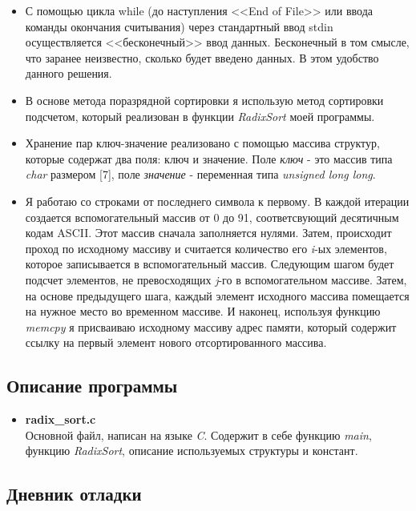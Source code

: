 \documentclass[12pt]{article}
\begin{document}
\begin{itemize}
    \item С помощью цикла while (до наступления <<End of File>> или ввода команды окончания считывания) через стандартный ввод stdin осуществляется <<бесконечный>> ввод данных. Бесконечный в том смысле, что заранее неизвестно, сколько будет введено данных. В этом удобство данного решения.
    \item В основе метода поразрядной сортировки я использую метод сортировки подсчетом, который реализован в функции {\it RadixSort} моей программы.
    \item Хранение пар ключ-значение реализовано с помощью массива структур, которые содержат два поля: ключ и значение. Поле {\it ключ} - это массив типа {\it char} размером [7], поле {\it значение} - переменная типа {\it unsigned long long}. 
    \item Я работаю со строками от последнего символа к первому. В каждой итерации создается вспомогательный массив от 0 до 91, соответсвующий десятичным кодам ASCII. Этот массив сначала заполняется нулями. Затем, происходит проход по исходному массиву и считается количество его {\it i}-ых элементов, которое записывается в вспомогательный массив. Следующим шагом будет подсчет элементов, не превосходящих {\it j}-го в вспомогательном массиве. Затем, на основе предыдущего шага, каждый элемент исходного массива помещается на нужное место во временном массиве. И наконец, используя функцию {\it memcpy} я присваиваю исходному массиву адрес памяти, который содержит ссылку на первый элемент нового отсортированного массива.
\end{itemize}

\subsection*{Описание программы}

\begin{itemize}
    \item \textbf{radix\_sort.c}\\ 
    Основной файл, написан на языке {\it C}. Содержит в себе функцию {\it main}, функцию {\it RadixSort}, описание используемых структуры и констант. 
\end{itemize} 

\subsection*{Дневник отладки}
\end{document}
